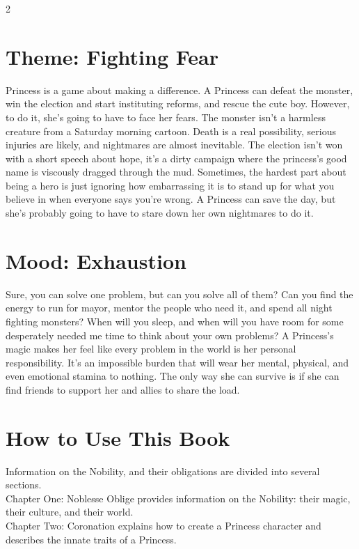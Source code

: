 \begin{multicols}{2}
\section*{Theme: Fighting Fear}

Princess is a game about making a difference. A Princess can defeat the monster, win the election and start instituting reforms, and rescue the cute boy. However, to do it, she’s going to have to face her fears. The monster isn’t a harmless creature from a Saturday morning cartoon. Death is a real possibility, serious injuries are likely, and nightmares are almost inevitable. The election isn’t won with a short speech about hope, it’s a dirty campaign where the princess's good name is viscously dragged through the mud. Sometimes, the hardest part about being a hero is just ignoring how embarrassing it is to stand up for what you believe in when everyone says you're wrong. A Princess can save the day, but she’s probably going to have to stare down her own nightmares to do it. 

\section*{Mood: Exhaustion}

Sure, you can solve one problem, but can you solve all of them? Can you find the energy to run for mayor, mentor the people who need it, and spend all night fighting monsters? When will you sleep, and when will you have room for some desperately needed me time to think about your own problems? A Princess’s magic makes her feel like every problem in the world is her personal responsibility. It’s an impossible burden that will wear her mental, physical, and even emotional stamina to nothing. The only way she can survive is if she can find friends to support her and allies to share the load. 

\section*{How to Use This Book}

Information on the Nobility, and their obligations are divided into several sections.\\

\noindent Chapter One: Noblesse Oblige provides information on the Nobility: their magic, their culture, and their world. \\

\noindent Chapter Two: Coronation explains how to create a Princess character and describes the innate traits of a Princess.\\


\end{multicols}
